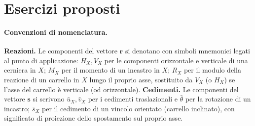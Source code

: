 \section{Esercizi proposti}

\paragraph*{Convenzioni di nomenclatura.}
\textbf{Reazioni.} Le componenti del vettore $\bm{r}$ si
denotano con simboli mnemonici legati al punto di applicazione:
$H_X, V_X$ per le componenti orizzontale e verticale di una
cerniera in $X$; $M_X$ per il momento di un incastro in $X$;
$R_X$ per il modulo della reazione di un carrello in $X$ lungo
il proprio asse, sostituito da $V_X$ (o $H_X$) se l'asse del
carrello è verticale (od orizzontale).
\textbf{Cedimenti.} Le componenti del vettore $\bm{s}$ si
scrivono $\bar{u}_X, \bar{v}_X$ per i cedimenti traslazionali e
$\bar{\theta}$ per la rotazione di un incastro; $\bar{s}_X$ per
il cedimento di un vincolo orientato (carrello inclinato), con
significato di proiezione dello spostamento sul proprio asse.



